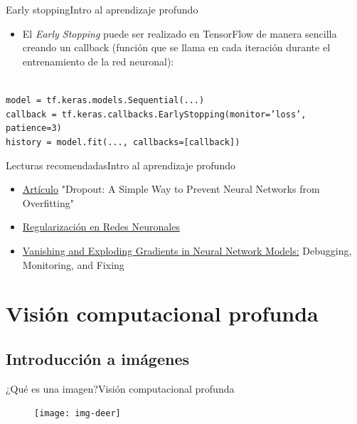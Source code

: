 \documentclass[10pt,border=3pt,tikz]{beamer}
\begin{document}
    \begin{frame}{Early stopping}{Intro al aprendizaje profundo}
        \begin{itemize}
            \item El \textit{Early Stopping} puede ser realizado en TensorFlow de manera sencilla creando un callback (función que se llama en cada iteración durante el entrenamiento de la red neuronal):\\
        \end{itemize}
        
        \texttt{\\model = tf.keras.models.Sequential(...)}\\
        \texttt{callback = tf.keras.callbacks.EarlyStopping(monitor='loss', patience=3)}\\
        \texttt{history = model.fit(..., callbacks=[callback])}
    \end{frame}
    
    \begin{frame}{Lecturas recomendadas}{Intro al aprendizaje profundo}
        \begin{itemize}
            \item \colorbox{blue!10}{\href{https://jmlr.org/papers/v15/srivastava14a.html}{Artículo}} "Dropout: A Simple Way to Prevent Neural Networks from Overfitting"
            \item \colorbox{blue!10}{\href{https://www.pinecone.io/learn/regularization-in-neural-networks/}{Regularización en Redes Neuronales}}
            \item \colorbox{blue!10}{\href{https://neptune.ai/blog/vanishing-and-exploding-gradients-debugging-monitoring-fixing}{Vanishing and Exploding Gradients in Neural Network Models:}} Debugging, Monitoring, and Fixing
        \end{itemize}
    \end{frame}
    
    
    \section{Visión computacional profunda}
    
    \subsection{Introducción a imágenes}
    \begin{frame}{¿Qué es una imagen?}{Visión computacional profunda}
        \begin{figure}
            \centering
            \texttt{[image: img-deer]}
        \end{figure}
    \end{frame}
    
\end{document}
